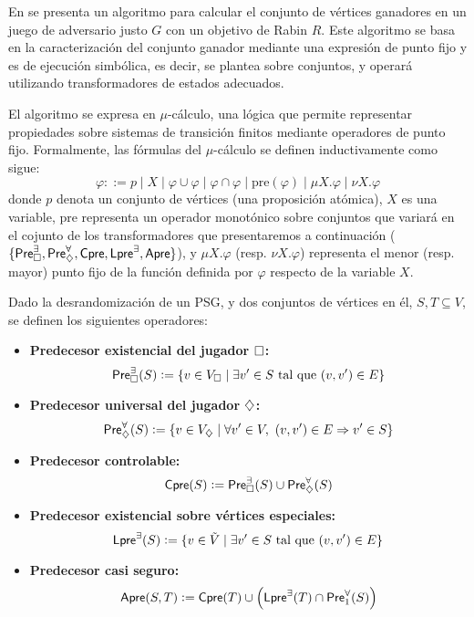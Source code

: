 
En \cite{Banerjee} se presenta un algoritmo para calcular el conjunto de
vértices ganadores en un juego de adversario justo \( G \) con un objetivo de
Rabin \( R \). Este algoritmo se basa en la caracterización del conjunto
ganador mediante una expresión de punto fijo y es de ejecución simbólica, es
decir, se plantea sobre conjuntos, y operará utilizando transformadores de
estados adecuados.

El algoritmo se expresa en $\mu$-cálculo, una lógica que permite representar
propiedades sobre sistemas de transición finitos mediante operadores de punto
fijo. Formalmente, las fórmulas del $\mu$-cálculo se definen inductivamente
como sigue:
\[
	\varphi ::= p \mid X \mid \varphi \cup \varphi \mid \varphi \cap \varphi \mid \text{pre}(\varphi) \mid \mu X.\varphi \mid \nu X.\varphi
\]
donde \( p \) denota un conjunto de vértices (una proposición atómica), \( X \)
es una variable, \(\text{pre}\) representa un operador monotónico sobre
conjuntos que variará en el cojunto de los transformadores que presentaremos a
continuación ($\{\textsf{Pre}_\square^\exists, \textsf{Pre}_\diamondsuit^\forall, \textsf{Cpre}, \textsf{Lpre}^\exists,
	\textsf{Apre}\}$), y \( \mu X.\varphi \) (resp. \( \nu X.\varphi \)) representa el
menor (resp. mayor) punto fijo de la función definida por \( \varphi \)
respecto de la variable \( X \).

Dado la desrandomización de un PSG, y dos conjuntos de vértices en él, \( S, T
\subseteq V \), se definen los siguientes operadores: %

\begin{itemize}
	\item \textbf{Predecesor existencial del jugador \( \square \):}
	      \[
		      \textsf{Pre}_\square^\exists(S) := \{v \in V_\square \mid \exists v' \in S \text{ tal que } (v, v') \in E\}
	      \]

	\item \textbf{Predecesor universal del jugador \( \diamondsuit \):}
	      \[
		      \textsf{Pre}_\diamondsuit^\forall(S) := \{v \in V_\diamondsuit \mid \forall v' \in V,\ (v, v') \in E \Rightarrow v' \in S\}
	      \]

	\item \textbf{Predecesor controlable:}
	      \[
		      \textsf{Cpre}(S) := \textsf{Pre}_\square^\exists(S) \cup \textsf{Pre}_\diamondsuit^\forall(S)
	      \]

	\item \textbf{Predecesor existencial sobre vértices especiales:}
	      \[
		      \textsf{Lpre}^\exists(S) := \{v \in \tilde V \mid \exists v' \in S \text{ tal que } (v, v') \in E\}
	      \]

	\item \textbf{Predecesor casi seguro:}
	      \[
		      \textsf{Apre}(S, T) := \textsf{Cpre}(T) \cup \left( \textsf{Lpre}^\exists(T) \cap \textsf{Pre}_1^\forall(S) \right)
	      \]
\end{itemize}

